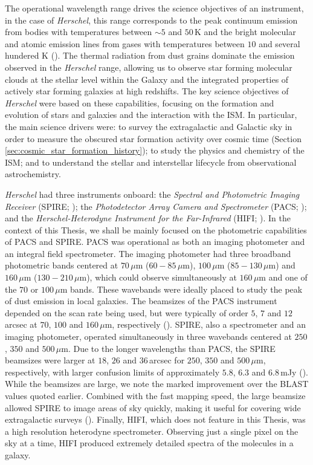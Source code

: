 The operational wavelength range drives the science objectives of an instrument, in the case of \textit{Herschel}, this range corresponds to the peak continuum emission from bodies with temperatures between $\sim5$ and $50\,$K and the bright molecular and atomic emission lines from gases with temperatures between $10$ and several hundered K (\citealt{Pilbratt_2008}). The thermal radiation from dust grains dominate the emission observed in the \textit{Herschel} range, allowing us to observe star forming molecular clouds at the stellar level within the Galaxy and the integrated properties of actively star forming galaxies at high redshifts. The key science objectives of \textit{Herschel} were based on these capabilities, focusing on the formation and evolution of stars and galaxies and the interaction with the ISM. In particular, the main science drivers were: to survey the extragalactic and Galactic sky in order to measure the obscured star formation activity over cosmic time (Section \ref{sec:cosmic_star_formation_history}); to study the physics and chemistry of the ISM; and to understand the stellar and interstellar lifecycle from observational astrochemistry.

\textit{Herschel} had three instruments onboard: the \textit{Spectral and Photometric Imaging Receiver} (SPIRE; \citealt{Griffin_2010}); the \textit{Photodetector Array Camera and Spectrometer} (PACS; \citealt{Poglitsch_2010}); and the \textit{Herschel-Heterodyne Instrument for the Far-Infrared} (HIFI; \citealt{deGraauw_2010}). In the context of this Thesis, we shall be mainly focused on the photometric capabilities of PACS and SPIRE. PACS was operational as both an imaging photometer and an integral field spectrometer. The imaging photometer had three broadband photometric bands centered at $70\,\mu$m ($60 - 85\,\mu$m), $100\,\mu$m ($85 - 130\,\mu$m) and $160\,\mu$m ($130 - 210\,\mu$m), which could observe simultaneously at $160\,\mu$m and one of the $70$ or $100\,\mu$m bands. These wavebands were ideally placed to study the peak of dust emission in local galaxies. The beamsizes of the PACS instrument depended on the scan rate being used, but were typically of order $5$, $7$ and $12\,$arcsec at $70$, $100$ and $160\,\mu$m, respectively (\citealt{Poglitsch_2010}). SPIRE, also a spectrometer and an imaging photometer, operated simultaneously in three wavebands centered at $250$, $350$ and $500\,\mu$m. Due to the longer wavelengths than PACS, the SPIRE beamsizes were larger at $18$, $26$ and $36\,$arcsec for $250$, $350$ and $500\,\mu$m, respectively, with larger confusion limits of approximately $5.8$, $6.3$ and $6.8\,$mJy (\citealt{Griffin_2010}). While the beamsizes are large, we note the marked improvement over the BLAST values quoted earlier. Combined with the fast mapping speed, the large beamsize allowed SPIRE to image areas of sky quickly, making it useful for covering wide extragalactic surveys (\citealt{Eales_2010, Oliver_2012, Holder_2013, Viero_2014}). Finally, HIFI, which does not feature in this Thesis, was a high resolution heterodyne spectrometer. Observing just a single pixel on the sky at a time, HIFI produced extremely detailed spectra of the molecules in a galaxy.

